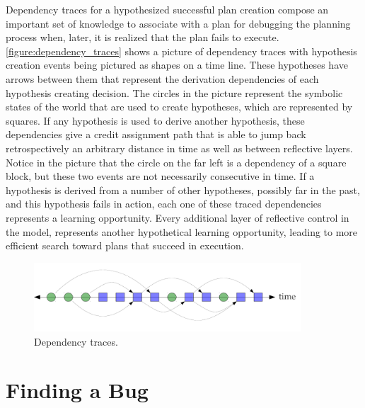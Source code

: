 Dependency traces for a hypothesized successful plan creation compose
an important set of knowledge to associate with a plan for debugging
the planning process when, later, it is realized that the plan fails
to execute.  {\mbox{\autoref{figure:dependency_traces}}} shows a
picture of dependency traces with hypothesis creation events being
pictured as shapes on a time line.  These hypotheses have arrows
between them that represent the derivation dependencies of each
hypothesis creating decision.  The circles in the picture represent
the symbolic states of the world that are used to create hypotheses,
which are represented by squares.  If any hypothesis is used to derive
another hypothesis, these dependencies give a credit assignment path
that is able to jump back retrospectively an arbitrary distance in
time as well as between reflective layers.  Notice in the picture that
the circle on the far left is a dependency of a square block, but
these two events are not necessarily consecutive in time.  If a
hypothesis is derived from a number of other hypotheses, possibly far
in the past, and this hypothesis fails in action, each one of these
traced dependencies represents a learning opportunity.  Every
additional layer of reflective control in the model, represents
another hypothetical learning opportunity, leading to more efficient
search toward plans that succeed in execution.
\begin{figure}
\center
\includegraphics[width=10cm]{gfx/dependency_traces}
\caption{Dependency traces.}
\label{figure:dependency_traces}
\end{figure}

\section{Finding a Bug}

